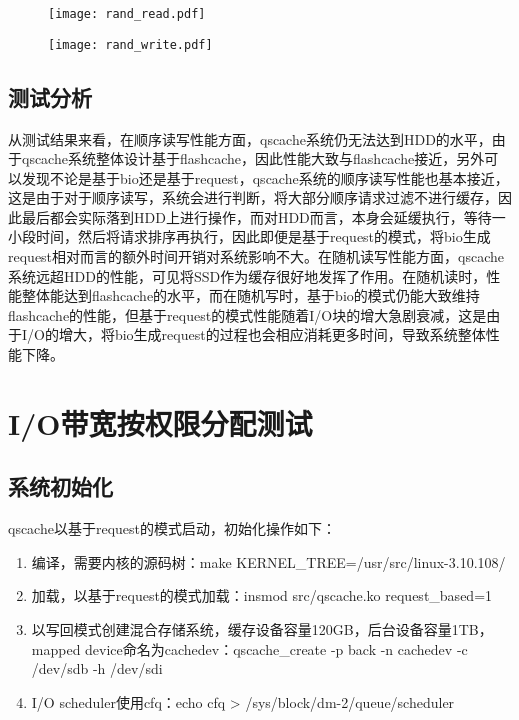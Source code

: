 \begin{figure}[!htbp]
    \centering
    \texttt{[image: rand\_read.pdf]}
\end{figure}

\begin{figure}[!htbp]
    \centering
    \texttt{[image: rand\_write.pdf]}
\end{figure}

\subsection{测试分析}

从测试结果来看，在顺序读写性能方面，qscache系统仍无法达到HDD的水平，由于qscache系统整体设计基于flashcache，因此性能大致与flashcache接近，另外可以发现不论是基于bio还是基于request，qscache系统的顺序读写性能也基本接近，这是由于对于顺序读写，系统会进行判断，将大部分顺序请求过滤不进行缓存，因此最后都会实际落到HDD上进行操作，而对HDD而言，本身会延缓执行，等待一小段时间，然后将请求排序再执行，因此即便是基于request的模式，将bio生成request相对而言的额外时间开销对系统影响不大。在随机读写性能方面，qscache系统远超HDD的性能，可见将SSD作为缓存很好地发挥了作用。在随机读时，性能整体能达到flashcache的水平，而在随机写时，基于bio的模式仍能大致维持flashcache的性能，但基于request的模式性能随着I/O块的增大急剧衰减，这是由于I/O的增大，将bio生成request的过程也会相应消耗更多时间，导致系统整体性能下降。

\section{I/O带宽按权限分配测试}

\subsection{系统初始化}
qscache以基于request的模式启动，初始化操作如下：
\begin{enumerate}
    \item 编译，需要内核的源码树：make KERNEL\_TREE=/usr/src/linux-3.10.108/
    \item 加载，以基于request的模式加载：insmod src/qscache.ko request\_based=1
    \item 以写回模式创建混合存储系统，缓存设备容量120GB，后台设备容量1TB，mapped device命名为cachedev：qscache\_create -p back -n cachedev -c /dev/sdb -h /dev/sdi
    \item I/O scheduler使用cfq：echo cfq > /sys/block/dm-2/queue/scheduler
\end{enumerate}

